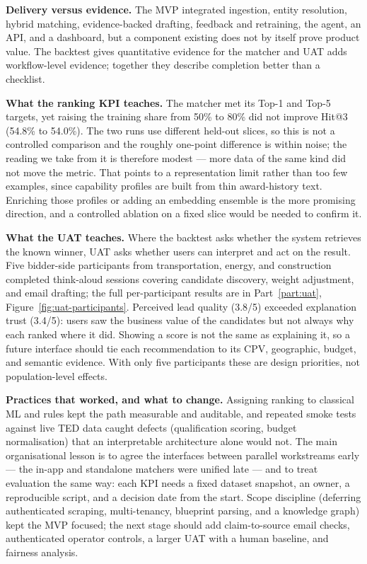 \textbf{Delivery versus evidence.} The MVP integrated ingestion, entity resolution,
hybrid matching, evidence-backed drafting, feedback and retraining, the agent, an API,
and a dashboard, but a component existing does not by itself prove product value. The
backtest gives quantitative evidence for the matcher and UAT adds workflow-level
evidence; together they describe completion better than a checklist.

\textbf{What the ranking KPI teaches.} The matcher met its Top-1 and Top-5 targets, yet
raising the training share from 50\% to 80\% did not improve Hit@3 (54.8\% to 54.0\%).
The two runs use different held-out slices, so this is not a controlled comparison and
the roughly one-point difference is within noise; the reading we take from it is
therefore modest --- more data of the same kind did not move the metric. That points to
a representation limit rather than too few examples, since capability profiles are built
from thin award-history text. Enriching those profiles or adding an embedding ensemble
is the more promising direction, and a controlled ablation on a fixed slice would be
needed to confirm it.

\textbf{What the UAT teaches.} Where the backtest asks whether the system retrieves the
known winner, UAT asks whether users can interpret and act on the result. Five
bidder-side participants from transportation, energy, and construction completed
think-aloud sessions covering candidate discovery, weight adjustment, and email
drafting; the full per-participant results are in Part~\ref{part:uat},
Figure~\ref{fig:uat-participants}. Perceived lead quality (3.8/5) exceeded explanation
trust (3.4/5): users saw the business value of the candidates but not always why each
ranked where it did. Showing a score is not the same as explaining it, so a future
interface should tie each recommendation to its CPV, geographic, budget, and semantic
evidence. With only five participants these are design priorities, not population-level
effects.

\textbf{Practices that worked, and what to change.} Assigning ranking to classical ML
and rules kept the path measurable and auditable, and repeated smoke tests against live
TED data caught defects (qualification scoring, budget normalisation) that an
interpretable architecture alone would not. The main organisational lesson is to agree
the interfaces between parallel workstreams early --- the in-app and standalone matchers
were unified late --- and to treat evaluation the same way: each KPI needs a fixed
dataset snapshot, an owner, a reproducible script, and a decision date from the start.
Scope discipline (deferring authenticated scraping, multi-tenancy, blueprint parsing,
and a knowledge graph) kept the MVP focused; the next stage should add claim-to-source
email checks, authenticated operator controls, a larger UAT with a human baseline, and
fairness analysis.

